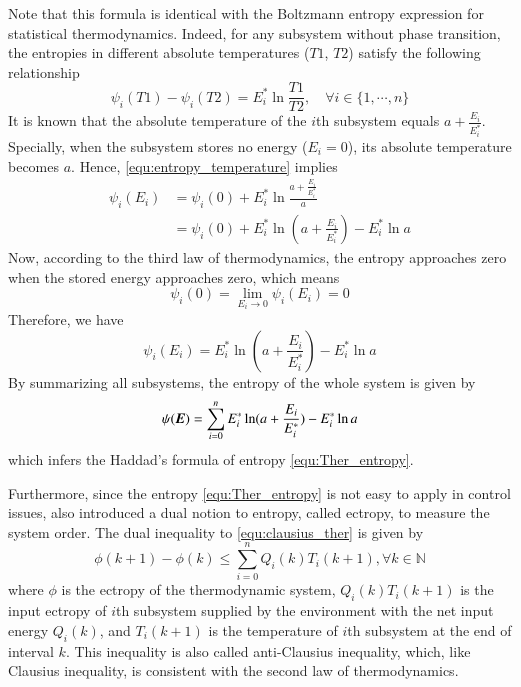 \documentclass[preprint,authoryear,12pt]{elsarticle}
\renewcommand{\vec}[1]{\mbox{\boldmath$#1$}}
\begin{document}
Note that this formula is identical with the Boltzmann entropy expression for statistical thermodynamics. Indeed, for any subsystem without phase transition, the entropies in different absolute temperatures ($T1$, $T2$) satisfy the following relationship \citep{cengel_thermodynamics:_2001}
\begin{equation}\label{equ:entropy_temperature}
\psi_i(T1)-\psi_i(T2)=E_i^* \ln \frac{T1}{T2},\quad \forall
i\in\{1,\cdots,n\}
\end{equation}
It is known that the absolute temperature of the $i$th subsystem equals $a+\frac{E_i}{E_i^*}$. Specially, when the subsystem stores no energy ($E_i=0$), its absolute temperature becomes $a$. Hence, \eqref{equ:entropy_temperature} implies
\begin{align}
\psi_i(E_i)&=\psi_i(0)+E_i^* \ln \frac{a+\frac{E_i}{E_i^*}}{a}
\nonumber\\
&=\psi_i(0)+E_i^* \ln (a+\frac{E_i}{E_i^*})-E_i^* \ln{a}
\label{equ:tmp_psi_1}
\end{align}
Now, according to the third law of thermodynamics, the entropy approaches zero when the stored energy approaches zero, which means
\begin{equation}\label{equ:entropy_zero}
\psi_i(0)=\lim_{E_i\rightarrow 0}\psi_i(E_i)=0
\end{equation}
Therefore, we have
\begin{equation}
\psi_i(E_i)=E_i^* \ln (a+\frac{E_i}{E_i^*})-E_i^* \ln{a}
\end{equation}
By summarizing all subsystems, the entropy of the whole system is given by
\begin{equation}
\psi(\vec{E})=\sum_{i=0}^n E_i^*\ln(a+\frac{E_i}{E_i^*})-E_i^*\ln a
\end{equation}
which infers the Haddad's formula of entropy \eqref{equ:Ther_entropy}.

Furthermore, since the entropy \eqref{equ:Ther_entropy} is not easy to apply in control issues, \citet{haddad_thermodynamic_2005} also introduced a dual notion to entropy, called ectropy, to measure the system order. The dual inequality to \eqref{equ:clausius_ther} is given by
\begin{equation}\label{equ:anti_clausius}
\phi(k+1)-\phi(k)\le \sum_{i=0}^n Q_i(k)T_i(k+1),
\forall k\in\mathbb{N}
\end{equation}
where $\phi$ is the ectropy of the thermodynamic system, $Q_i(k)T_i(k+1)$ is the input ectropy of $i$th subsystem supplied by the environment with the net input energy $Q_i(k)$, and $T_i(k+1)$ is the temperature of $i$th subsystem at the end of interval $k$. This inequality is also called anti-Clausius inequality, which, like Clausius inequality, is consistent with the second law of thermodynamics.
\end{document}
